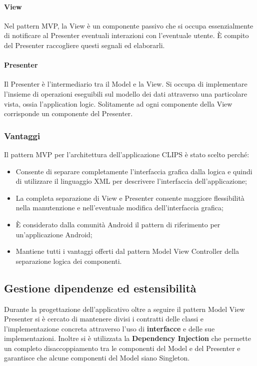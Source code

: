 \documentclass[../ManualeSviluppatore.tex]{subfiles}
\begin{document}
				\paragraph*{View}
					Nel pattern MVP, la View è un componente passivo che si occupa essenzialmente di notificare al Presenter eventuali interazioni con l'eventuale utente. È compito del Presenter raccogliere questi segnali ed elaborarli.
					
				\paragraph*{Presenter}
					Il Presenter è l'intermediario tra il Model e la View. Si occupa di implementare l'insieme di operazioni eseguibili sul modello dei dati attraverso una particolare vista, ossia l'application logic. Solitamente ad ogni componente della View corrisponde un componente del Presenter.
					
			\subsubsection{Vantaggi}
				Il pattern MVP per l'architettura dell'applicazione CLIPS è stato scelto perché:
				\begin{itemize}
					\item Consente di separare completamente l'interfaccia grafica dalla logica e quindi di utilizzare il linguaggio XML per descrivere l'interfaccia dell'applicazione;
					\item La completa separazione di View e Presenter consente maggiore flessibilità nella manutenzione e nell'eventuale modifica dell'interfaccia grafica;
					\item È considerato dalla comunità \gls{Android} il pattern di riferimento per un'applicazione \gls{Android};
					\item Mantiene tutti i vantaggi offerti dal pattern Model View Controller della separazione logica dei componenti.
				\end{itemize}
	
	
	\subsection{Gestione dipendenze ed estensibilità}
		Durante la progettazione dell'applicativo oltre a seguire il pattern Model View Presenter si è cercato di mantenere divisi i contratti delle classi e l'implementazione concreta attraverso l'uso di \textbf{interfacce} e delle sue implementazioni.
		Inoltre si è utilizzata la \textbf{Dependency Injection} che permette un completo disaccoppiamento tra le componenti del Model e del Presenter e garantisce che alcune componenti del Model siano Singleton.
		
\end{document}
